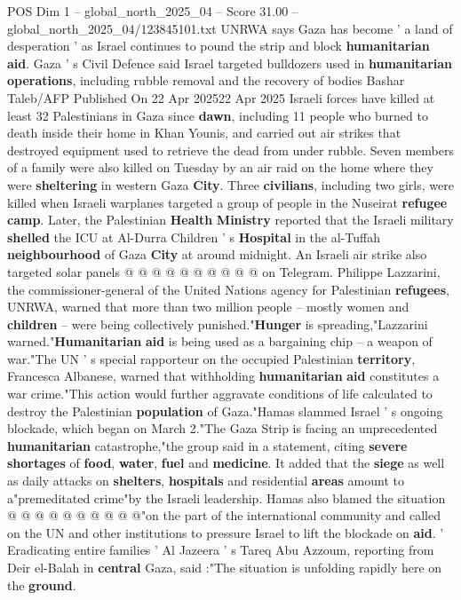 \begin{textsample}{POS Dim 1 – global\_north\_2025\_04 – Score 31.00 – global\_north\_2025\_04/123845101.txt}  \label{ex:f1_pos_345}
UNRWA says Gaza has become ' a land of desperation ' as Israel continues to pound the strip and block \textbf{humanitarian} \textbf{aid}.
Gaza ' s Civil Defence said Israel targeted bulldozers used in \textbf{humanitarian} \textbf{operations}, including rubble removal and the recovery of bodies Bashar Taleb/AFP Published On 22 Apr 202522 Apr 2025 Israeli forces have killed at least 32 Palestinians in Gaza since \textbf{dawn}, including 11 people who burned to death inside their home in Khan Younis, and carried out air strikes that destroyed equipment used to retrieve the dead from under rubble.
Seven members of a family were also killed on Tuesday by an air raid on the home where they were \textbf{sheltering} in western Gaza \textbf{City}.
Three \textbf{civilians}, including two girls, were killed when Israeli warplanes targeted a group of people in the Nuseirat \textbf{refugee} \textbf{camp}.
Later, the Palestinian \textbf{Health} \textbf{Ministry} reported that the Israeli military \textbf{shelled} the ICU at Al-Durra Children ' s \textbf{Hospital} in the al-Tuffah \textbf{neighbourhood} of Gaza \textbf{City} at around midnight.
An Israeli air strike also targeted solar panels @ @ @ @ @ @ @ @ @ @ on Telegram.
Philippe Lazzarini, the commissioner-general of the United Nations agency for Palestinian \textbf{refugees}, UNRWA, warned that more than two million people -- mostly women and \textbf{children} -- were being collectively punished."\textbf{Hunger} is spreading,"Lazzarini warned."\textbf{Humanitarian} \textbf{aid} is being used as a bargaining chip -- a weapon of war."The UN ' s special rapporteur on the occupied Palestinian \textbf{territory}, Francesca Albanese, warned that withholding \textbf{humanitarian} \textbf{aid} constitutes a war crime."This action would further aggravate conditions of life calculated to destroy the Palestinian \textbf{population} of Gaza."Hamas slammed Israel ' s ongoing blockade, which began on March 2."The Gaza Strip is facing an unprecedented \textbf{humanitarian} catastrophe,"the group said in a statement, citing \textbf{severe} \textbf{shortages} of \textbf{food}, \textbf{water}, \textbf{fuel} and \textbf{medicine}.
It added that the \textbf{siege} as well as daily attacks on \textbf{shelters}, \textbf{hospitals} and residential \textbf{areas} amount to a"premeditated crime"by the Israeli leadership.
Hamas also blamed the situation @ @ @ @ @ @ @ @ @ @"on the part of the international community and called on the UN and other institutions to pressure Israel to lift the blockade on \textbf{aid}. ' Eradicating entire families ' Al Jazeera ' s Tareq Abu Azzoum, reporting from Deir el-Balah in \textbf{central} Gaza, said :"The situation is unfolding rapidly here on the \textbf{ground}.

\end{textsample}
